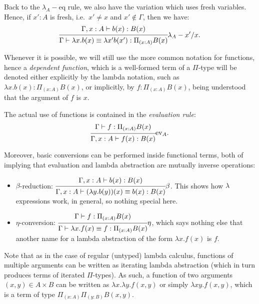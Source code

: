 Back to the $ \lambda_A-\text{eq} $ rule, we also have the variation
which uses fresh variables. Hence, if $ x' : A $ is fresh, i.e.\
$ x' \neq x $ and $ x' \notin \Gamma $, then we have:
\[
  \begin{prooftree}
    \hypo{\Gamma, x : A \vdash b(x) : B(x)}
    \infer1{\Gamma \vdash \lambda x . b(x) \equiv \lambda x' b(x') : %
      \Pi_{(x : A)} B(x)}
  \end{prooftree}\lambda_A-x'/x.
\]

Whenever it is possible, we will still use the more common notation
for functions, hence a \emph{dependent function}, which is a well-formed
term of a $ \Pi $-type will be denoted either explicitly by the
lambda notation, such as $ \lambda x . b(x) : \Pi_{(x : A)} B(x) $,
or implicitly, by $ f : \Pi_{(x : A)} B(x) $, being understood that
the argument of $ f $ is $ x $.

The actual use of functions is contained in the \emph{evaluation rule}:
\[
  \begin{prooftree}
    \hypo{\Gamma \vdash f : \Pi_{(x : A)} B(x)}
    \infer1{\Gamma, x : A \vdash f(x) : B(x)}
  \end{prooftree}\dr{ev}_A.
\]

Moreover, basic conversions can be performed inside functional terms,
both of implying that evaluation and lambda abstraction are mutually
inverse operations:
\begin{itemize}
\item $ \beta $-reduction:
  $ \begin{prooftree}
    \hypo{\Gamma, x : A \vdash b(x) : B(x)}
    \infer1{\Gamma, x : A \vdash (\lambda y . b(y))(x) \equiv b(x) : B(x)}
  \end{prooftree}\beta
  $. This shows how $ \lambda $ expressions work, in general,
  so nothing special here.
\item $ \eta $-conversion:
  $ \begin{prooftree}
    \hypo{\Gamma \vdash f : \Pi_{(x : A)} B(x)}
    \infer1{\Gamma \vdash \lambda x . f(x) \equiv f : \Pi_{(x:A)} B(x)}
  \end{prooftree}\eta
  $, which says nothing else that another name for a lambda abstraction
  of the form $ \lambda x . f(x) $ is $ f $.
\end{itemize}

Note that as in the case of regular (untyped) lambda calculus, functions of
multiple arguments can be written as iterating lambda abstraction
(which in turn produces terms of iterated $ \Pi $-types). As such,
a function of two arguments $ (x, y) \in A \times B $ can be written as
$ \lambda x . \lambda y . f(x, y) $ or simply $ \lambda xy.f(x,y) $,
which is a term of type $ \Pi_{(x : A)} \Pi_{(y : B)} B(x, y) $.

